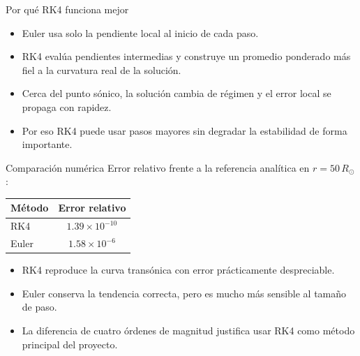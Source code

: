 \documentclass[aspectratio=169]{beamer}
\begin{document}
\begin{frame}{Por qu\'e RK4 funciona mejor}
  \begin{itemize}
    \item Euler usa solo la pendiente local al inicio de cada paso.
    \item RK4 eval\'ua pendientes intermedias y construye un promedio ponderado m\'as fiel a la curvatura real de la soluci\'on.
    \item Cerca del punto s\'onico, la soluci\'on cambia de r\'egimen y el error local se propaga con rapidez.
    \item Por eso RK4 puede usar pasos mayores sin degradar la estabilidad de forma importante.
  \end{itemize}
\end{frame}

\begin{frame}{Comparaci\'on num\'erica}
  Error relativo frente a la referencia anal\'itica en $r=50\,R_\odot$:

  \begin{table}
    \centering
    \begin{tabular}{lc}
      \toprule
      M\'etodo & Error relativo \\
      \midrule
      RK4 & $1.39 \times 10^{-10}$ \\
      Euler & $1.58 \times 10^{-6}$ \\
      \bottomrule
    \end{tabular}
  \end{table}

  \begin{itemize}
    \item RK4 reproduce la curva trans\'onica con error pr\'acticamente despreciable.
    \item Euler conserva la tendencia correcta, pero es mucho m\'as sensible al tama\~no de paso.
    \item La diferencia de cuatro \'ordenes de magnitud justifica usar RK4 como m\'etodo principal del proyecto.
  \end{itemize}
\end{frame}
\end{document}
